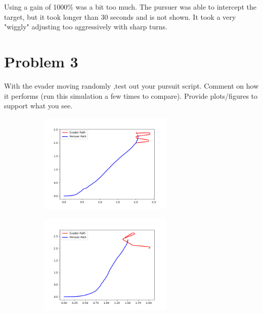 \documentclass{article}
\begin{document}
\bigskip
\noindent Using a gain of 1000\% was a bit too much. The pursuer was able to intercept the target, but it took longer than 30 seconds and is not shown. It took a very "wiggly" adjusting too aggressively with sharp turns.

\section*{Problem 3}

With the evader moving randomly ,test out your pursuit script. Comment on how it performs (run 
this simulation a few times to compare). Provide plots/figures to support what you see.

\bigskip
\begin{figure}[H]
    \begin{subfigure}[b]{0.5\textwidth}
        \centering
        \includegraphics[width=0.7\textwidth]{images/question3a.png}
        \label{fig:question3a}
    \end{subfigure}
    \begin{subfigure}[b]{0.5\textwidth}
        \centering
        \includegraphics[width=0.7\textwidth]{images/question3b.png}
        \label{fig:question3b}
    \end{subfigure}

\end{figure}
\end{document}
